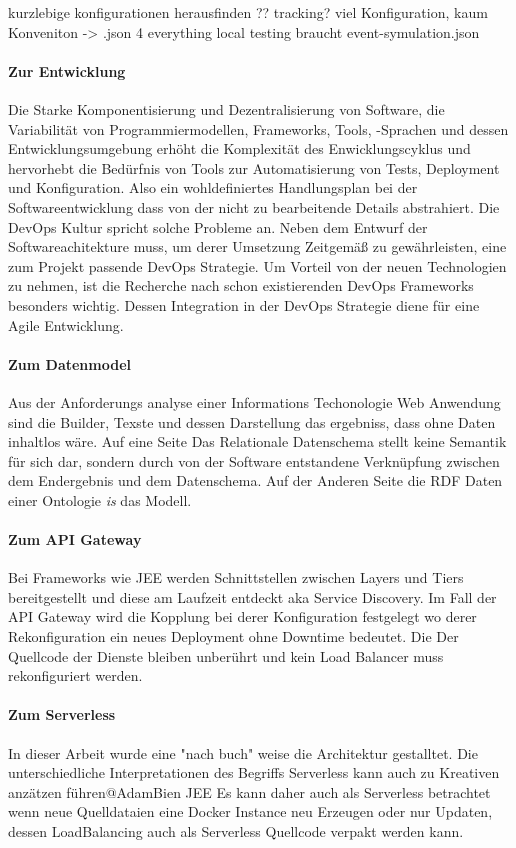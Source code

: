 \documentclass[
12pt,
english,
ngerman,
headsepline,
twoside,
openright,
numbers=noenddot,version=first
]{scrreprt}
\begin{document}
kurzlebige konfigurationen herausfinden ?? tracking?
viel Konfiguration, kaum Konveniton -> .json 4 everything
local testing braucht event-symulation.json



\paragraph{Zur Entwicklung}
Die Starke Komponentisierung und Dezentralisierung von Software, die Variabilität von Programmiermodellen, Frameworks, Tools, -Sprachen und dessen Entwicklungsumgebung erhöht die Komplexität des Enwicklungscyklus und hervorhebt die Bedürfnis von Tools zur Automatisierung von Tests, Deployment und Konfiguration. Also ein wohldefiniertes Handlungsplan bei der Softwareentwicklung dass von der nicht zu bearbeitende Details abstrahiert. 
Die DevOps Kultur spricht solche Probleme an. Neben dem Entwurf der Softwareachitekture  muss, um derer Umsetzung Zeitgemäß zu gewährleisten, eine zum Projekt passende DevOps Strategie.
Um Vorteil von der neuen Technologien zu nehmen, ist die Recherche nach schon existierenden DevOps Frameworks besonders wichtig. Dessen Integration in der DevOps Strategie diene für eine Agile Entwicklung.

\paragraph{Zum Datenmodel}
Aus der Anforderungs analyse einer Informations Techonologie Web Anwendung sind die Builder, Texste und dessen Darstellung das ergebniss, dass ohne Daten inhaltlos wäre. Auf eine Seite Das Relationale Datenschema stellt keine Semantik für sich dar, sondern durch von der Software entstandene Verknüpfung zwischen dem Endergebnis und dem Datenschema. Auf der Anderen Seite die  RDF Daten einer Ontologie \textit{is} das Modell.

\paragraph{Zum API Gateway}
Bei Frameworks wie JEE werden Schnittstellen zwischen Layers und Tiers bereitgestellt und diese am Laufzeit entdeckt aka Service Discovery. 
Im Fall der API Gateway wird die Kopplung bei derer Konfiguration festgelegt wo derer Rekonfiguration ein neues Deployment ohne Downtime bedeutet. Die Der Quellcode der Dienste bleiben unberührt und kein Load Balancer muss rekonfiguriert werden. 


\paragraph{Zum Serverless}
In dieser Arbeit wurde eine "nach buch" weise die Architektur gestalltet. Die unterschiedliche Interpretationen des Begriffs Serverless kann auch zu Kreativen anzätzen führen@AdamBien JEE
Es kann daher auch als Serverless betrachtet wenn neue Quelldataien eine Docker Instance neu Erzeugen oder nur Updaten, dessen LoadBalancing auch als Serverless Quellcode verpakt werden kann. 
\end{document}
